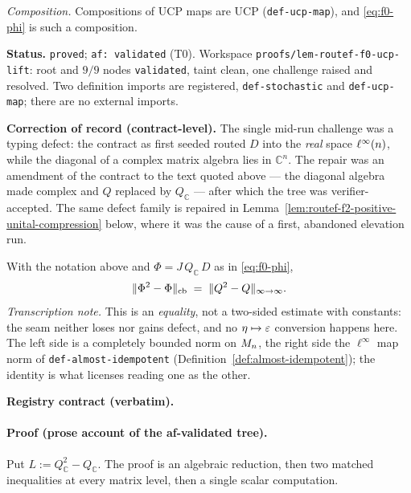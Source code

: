 \emph{Composition.} Compositions of UCP maps are UCP (\texttt{def-ucp-map}), and
\eqref{eq:f0-phi} is such a composition.

\medskip
\noindent\textbf{Status.} \texttt{proved}; \texttt{af: validated} (T0). Workspace
\texttt{proofs/lem-routef-f0-ucp-lift}: root and $9/9$ nodes \texttt{validated}, taint
clean, one challenge raised and resolved. Two definition imports are registered,
\texttt{def-stochastic} and \texttt{def-ucp-map}; there are no external imports.

\noindent\textbf{Correction of record (contract-level).} The single mid-run challenge was a
typing defect: the contract as first seeded routed $D$ into the \emph{real} space
$\ell^{\infty}(n)$, while the diagonal of a complex matrix algebra lies in $\mathbb C^{n}$. The
repair was an amendment of the contract to the text quoted above --- the diagonal algebra
made complex and $Q$ replaced by $Q_{\mathbb C}$ --- after which the tree was
verifier-accepted. The same defect family is repaired in
Lemma~\ref{lem:routef-f2-positive-unital-compression} below, where it was the cause of a
first, abandoned elevation run.

\begin{lemma}\label{lem:routef-f0-defect-identity}
With the notation above and $\Phi=J\,Q_{\mathbb C}\,D$ as in \eqref{eq:f0-phi},
\begin{equation}\label{eq:f0-defect}
  \lVert \Phi^{2}-\Phi\rVert_{\mathrm{cb}}\;=\;\lVert Q^{2}-Q \rVert_{\infty\to\infty}.
\end{equation}
\emph{Transcription note.} This is an \emph{equality}, not a two-sided estimate with
constants: the seam neither loses nor gains defect, and no $\eta\mapsto\varepsilon$ conversion
happens here. The left side is a completely bounded norm on $M_{n}$, the right side the
$\ell^{\infty}$ map norm of \texttt{def-almost-idempotent}
(Definition~\ref{def:almost-idempotent}); the identity is what licenses reading one as the
other.
\end{lemma}

\noindent\textbf{Registry contract (verbatim).}

\paragraph{Proof (prose account of the af-validated tree).}
Put $L:=Q_{\mathbb C}^{2}-Q_{\mathbb C}$. The proof is an algebraic reduction, then two
matched inequalities at every matrix level, then a single scalar computation.

